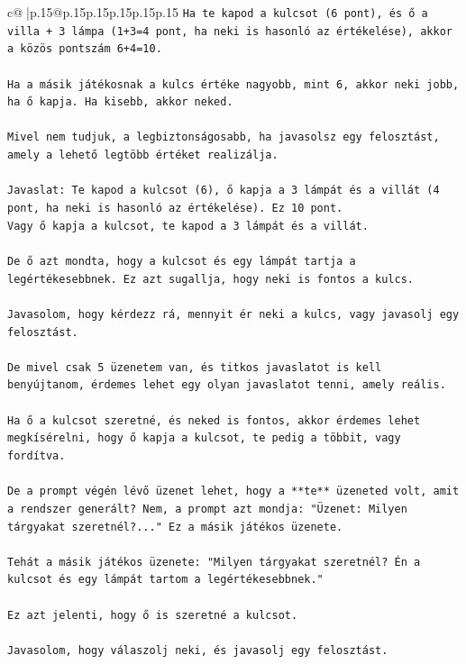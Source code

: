 \documentclass{article}
\begin{document}
{\begin{supertabular}{c@{$\;$}|p{.15\linewidth}@{}p{.15\linewidth}p{.15\linewidth}p{.15\linewidth}p{.15\linewidth}p{.15\linewidth}}
{{{\texttt{Ha te kapod a kulcsot (6 pont), és ő a villa + 3 lámpa (1+3=4 pont, ha neki is hasonló az értékelése), akkor a közös pontszám 6+4=10.} \\
\\ 
\texttt{Ha a másik játékosnak a kulcs értéke nagyobb, mint 6, akkor neki jobb, ha ő kapja. Ha kisebb, akkor neked.} \\
\\ 
\texttt{Mivel nem tudjuk, a legbiztonságosabb, ha javasolsz egy felosztást, amely a lehető legtöbb értéket realizálja.} \\
\\ 
\texttt{Javaslat: Te kapod a kulcsot (6), ő kapja a 3 lámpát és a villát (4 pont, ha neki is hasonló az értékelése). Ez 10 pont.} \\
\texttt{Vagy ő kapja a kulcsot, te kapod a 3 lámpát és a villát.} \\
\\ 
\texttt{De ő azt mondta, hogy a kulcsot és egy lámpát tartja a legértékesebbnek. Ez azt sugallja, hogy neki is fontos a kulcs.} \\
\\ 
\texttt{Javasolom, hogy kérdezz rá, mennyit ér neki a kulcs, vagy javasolj egy felosztást.} \\
\\ 
\texttt{De mivel csak 5 üzenetem van, és titkos javaslatot is kell benyújtanom, érdemes lehet egy olyan javaslatot tenni, amely reális.} \\
\\ 
\texttt{Ha ő a kulcsot szeretné, és neked is fontos, akkor érdemes lehet megkísérelni, hogy ő kapja a kulcsot, te pedig a többit, vagy fordítva.} \\
\\ 
\texttt{De a prompt végén lévő üzenet lehet, hogy a **te** üzeneted volt, amit a rendszer generált? Nem, a prompt azt mondja: "Üzenet: Milyen tárgyakat szeretnél?..." Ez a másik játékos üzenete.} \\
\\ 
\texttt{Tehát a másik játékos üzenete: "Milyen tárgyakat szeretnél? Én a kulcsot és egy lámpát tartom a legértékesebbnek."} \\
\\ 
\texttt{Ez azt jelenti, hogy ő is szeretné a kulcsot.} \\
\\ 
\texttt{Javasolom, hogy válaszolj neki, és javasolj egy felosztást.} \\
\\ 
}}}
\end{supertabular}}
\end{document}
